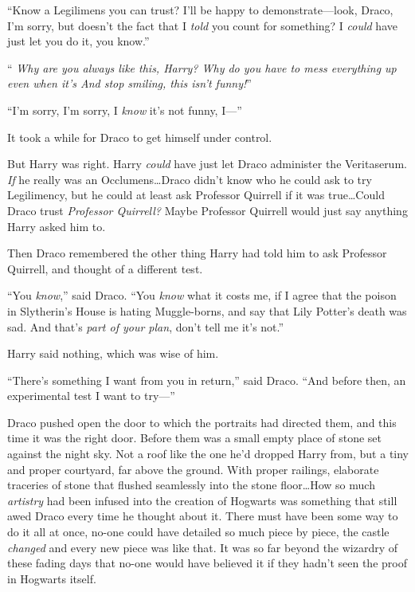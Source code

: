 “Know a Legilimens you can trust? I’ll be happy to demonstrate—look, Draco, I’m sorry, but doesn’t the fact that I \emph{told} you count for something? I \emph{could} have just let you do it, you know.”

“\emph{ Why are you always like this, Harry? Why do you have to mess everything up even when it’s  And stop smiling, this isn’t funny!}”

“I’m sorry, I’m sorry, I \emph{know} it’s not funny, I—”

It took a while for Draco to get himself under control.

But Harry was right. Harry \emph{could} have just let Draco administer the Veritaserum. \emph{If} he really was an Occlumens…Draco didn’t know who he could ask to try Legilimency, but he could at least ask Professor Quirrell if it was true…Could Draco trust \emph{Professor Quirrell?} Maybe Professor Quirrell would just say anything Harry asked him to.

Then Draco remembered the other thing Harry had told him to ask Professor Quirrell, and thought of a different test.

“You \emph{know},” said Draco. “You \emph{know} what it costs me, if I agree that the poison in Slytherin’s House is hating Muggle-borns, and say that Lily Potter’s death was sad. And that’s \emph{part of your plan}, don’t tell me it’s not.”

Harry said nothing, which was wise of him.

“There’s something I want from you in return,” said Draco. “And before then, an experimental test I want to try—”

\later

Draco pushed open the door to which the portraits had directed them, and this time it was the right door. Before them was a small empty place of stone set against the night sky. Not a roof like the one he’d dropped Harry from, but a tiny and proper courtyard, far above the ground. With proper railings, elaborate traceries of stone that flushed seamlessly into the stone floor…How so much \emph{artistry} had been infused into the creation of Hogwarts was something that still awed Draco every time he thought about it. There must have been some way to do it all at once, no-one could have detailed so much piece by piece, the castle \emph{changed} and every new piece was like that. It was so far beyond the wizardry of these fading days that no-one would have believed it if they hadn’t seen the proof in Hogwarts itself.

